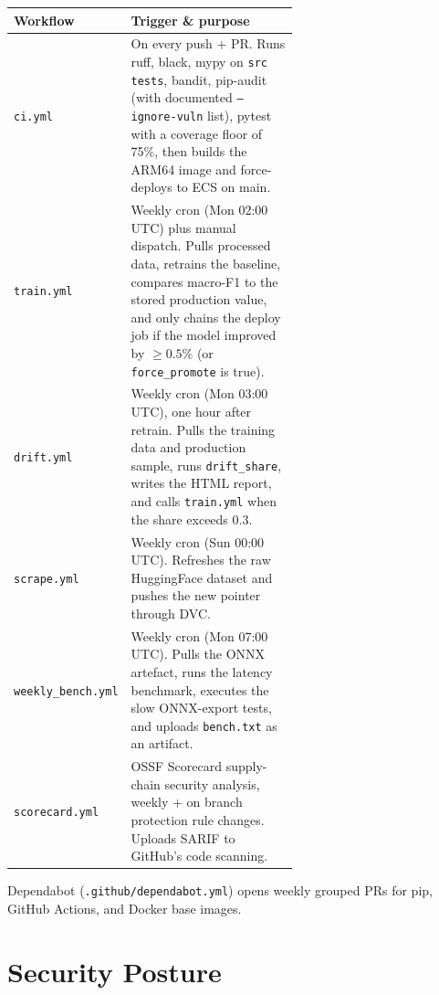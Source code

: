 \documentclass[11pt,a4paper]{article}
\begin{document}
\begin{longtable}{@{}lp{0.62\linewidth}@{}}
\toprule
\textbf{Workflow} & \textbf{Trigger \& purpose} \\ \midrule \endhead
\texttt{ci.yml} & On every push + PR. Runs ruff, black, mypy on \texttt{src tests},
                  bandit, pip-audit (with documented \texttt{--ignore-vuln} list),
                  pytest with a coverage floor of 75\%, then builds the ARM64 image
                  and force-deploys to ECS on main. \\
\texttt{train.yml} & Weekly cron (Mon 02:00 UTC) plus manual dispatch. Pulls
                     processed data, retrains the baseline, compares macro-F1 to the
                     stored production value, and only chains the deploy job if the
                     model improved by $\geq 0.5\%$ (or \texttt{force\_promote} is
                     true). \\
\texttt{drift.yml} & Weekly cron (Mon 03:00 UTC), one hour after retrain. Pulls
                     the training data and production sample, runs
                     \texttt{drift\_share}, writes the HTML report, and calls
                     \texttt{train.yml} when the share exceeds 0.3. \\
\texttt{scrape.yml} & Weekly cron (Sun 00:00 UTC). Refreshes the raw HuggingFace
                      dataset and pushes the new pointer through DVC. \\
\texttt{weekly\_bench.yml} & Weekly cron (Mon 07:00 UTC). Pulls the ONNX artefact,
                             runs the latency benchmark, executes the slow
                             ONNX-export tests, and uploads \texttt{bench.txt} as
                             an artifact. \\
\texttt{scorecard.yml} & OSSF Scorecard supply-chain security analysis, weekly +
                         on branch protection rule changes. Uploads SARIF to
                         GitHub's code scanning. \\
\bottomrule
\end{longtable}

\noindent Dependabot (\texttt{.github/dependabot.yml}) opens weekly grouped PRs for
pip, GitHub Actions, and Docker base images.

\section{Security Posture}
\end{document}
